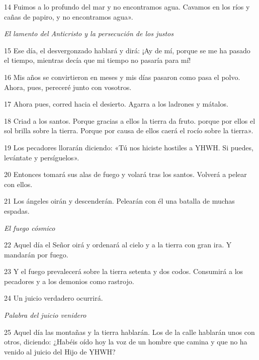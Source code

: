 \par 14 Fuimos a lo profundo del mar y no encontramos agua. Cavamos en los ríos y cañas de papiro, y no encontramos agua».


\par \textit{El lamento del Anticristo y la persecución de los justos}


\par 15 Ese día, el desvergonzado hablará y dirá: ¡Ay de mí, porque se me ha pasado el tiempo, mientras decía que mi tiempo no pasaría para mí!

\par 16 Mis años se convirtieron en meses y mis días pasaron como pasa el polvo. Ahora, pues, pereceré junto con vosotros.

\par 17 Ahora pues, corred hacia el desierto. Agarra a los ladrones y mátalos.

\par 18 Criad a los santos. Porque gracias a ellos la tierra da fruto. porque por ellos el sol brilla sobre la tierra. Porque por causa de ellos caerá el rocío sobre la tierra».

\par 19 Los pecadores llorarán diciendo: «Tú nos hiciste hostiles a YHWH. Si puedes, levántate y persíguelos».

\par 20 Entonces tomará sus alas de fuego y volará tras los santos. Volverá a pelear con ellos.

\par 21 Los ángeles oirán y descenderán. Pelearán con él una batalla de muchas espadas.

\par \textit{El fuego cósmico}

\par 22 Aquel día el Señor oirá y ordenará al cielo y a la tierra con gran ira. Y mandarán por fuego.

\par 23 Y el fuego prevalecerá sobre la tierra setenta y dos codos. Consumirá a los pecadores y a los demonios como rastrojo.

\par 24 Un juicio verdadero ocurrirá.

\par \textit{Palabra del juicio venidero}

\par 25 Aquel día las montañas y la tierra hablarán. Los de la calle hablarán unos con otros, diciendo: ¿Habéis oído hoy la voz de un hombre que camina y que no ha venido al juicio del Hijo de YHWH?

